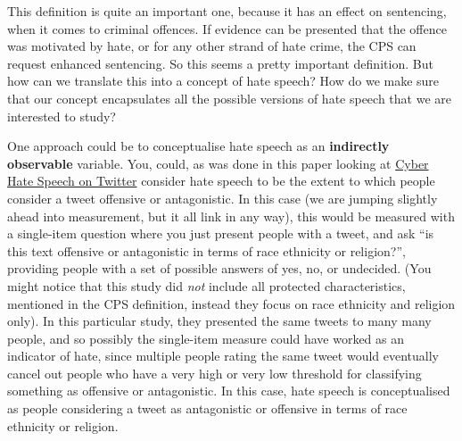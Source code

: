 \documentclass[
]{book}
\begin{document}
This definition is quite an important one, because it has an effect on sentencing, when it comes to criminal offences. If evidence can be presented that the offence was motivated by hate, or for any other strand of hate crime, the CPS can request enhanced sentencing. So this seems a pretty important definition. But how can we translate this into a concept of hate speech? How do we make sure that our concept encapsulates all the possible versions of hate speech that we are interested to study?

One approach could be to conceptualise hate speech as an \textbf{indirectly observable} variable. You, could, as was done in this paper looking at \href{http://onlinelibrary.wiley.com/doi/10.1002/poi3.85/full}{Cyber Hate Speech on Twitter} consider hate speech to be the extent to which people consider a tweet offensive or antagonistic. In this case (we are jumping slightly ahead into measurement, but it all link in any way), this would be measured with a single-item question where you just present people with a tweet, and ask ``is this text offensive or antagonistic in terms of race ethnicity or religion?'', providing people with a set of possible answers of yes, no, or undecided. (You might notice that this study did \emph{not} include all protected characteristics, mentioned in the CPS definition, instead they focus on race ethnicity and religion only). In this particular study, they presented the same tweets to many many people, and so possibly the single-item measure could have worked as an indicator of hate, since multiple people rating the same tweet would eventually cancel out people who have a very high or very low threshold for classifying something as offensive or antagonistic. In this case, hate speech is conceptualised as people considering a tweet as antagonistic or offensive in terms of race ethnicity or religion.
\end{document}
